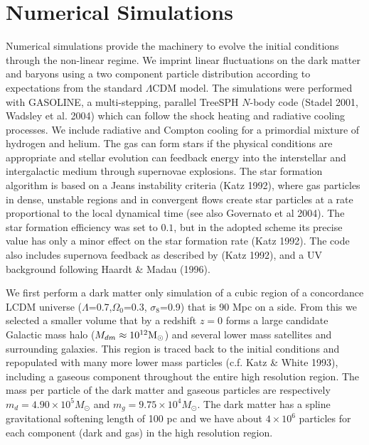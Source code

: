 \documentclass[preprint]{aastex}
\newcommand{\Msun}{{\rm M_\odot}}
\begin{document}
\section{Numerical Simulations}
\label{section:numsim}


Numerical simulations provide the machinery to evolve the initial
conditions through the non-linear regime. We imprint linear fluctuations on the 
dark matter and baryons using a two component particle distribution 
according to expectations from the standard $\Lambda$CDM model.
The simulations were performed with GASOLINE, a multi-stepping, parallel 
TreeSPH $N$-body code (Stadel 2001, Wadsley et al. 2004)  
which can follow the shock heating and radiative cooling processes.
We include radiative and Compton cooling for a primordial 
mixture of hydrogen and helium. 
The gas can form
stars if the physical conditions are appropriate and stellar evolution can feedback energy
into the interstellar and intergalactic medium through supernovae explosions.
The star formation algorithm is based on 
a Jeans instability criteria (Katz 1992), where gas particles in dense, 
unstable regions and in 
convergent flows create star particles at a rate proportional to the local dynamical
time (see also Governato et al 2004). The star formation efficiency
was set to $0.1$, but in the adopted scheme its precise value has only a minor effect 
on the star formation rate (Katz 1992). The code also includes supernova
feedback as described by (Katz 1992), and a UV background following Haardt \&
Madau (1996).

We first perform a dark matter only simulation of a cubic region of a 
concordance  LCDM universe ($\Lambda$=0.7,$\Omega_0$=0.3,
$\sigma_8$=0.9) that is 90 Mpc on a side. From this we 
selected a smaller volume that by a redshift $z=0$ forms a large
candidate Galactic mass halo ($M_{dm} \approx 10^{12} \Msun$) and several
lower mass satellites and surrounding galaxies.  This region is traced back to
the initial conditions and repopulated with many more lower mass 
particles (c.f. Katz \& White 1993), including a gaseous component
throughout the entire high resolution region. The mass per particle of the dark matter
and gaseous particles are respectively
$m_{d} = 4.90 \times 10^5 M_{\odot}$ and $m_g = 9.75 \times 10^4
M_{\odot}$. The dark matter has a spline gravitational softening length of 100 pc and we
have about $4\times 10^6$ particles for each component (dark and gas) in the
high resolution region.
\end{document}
